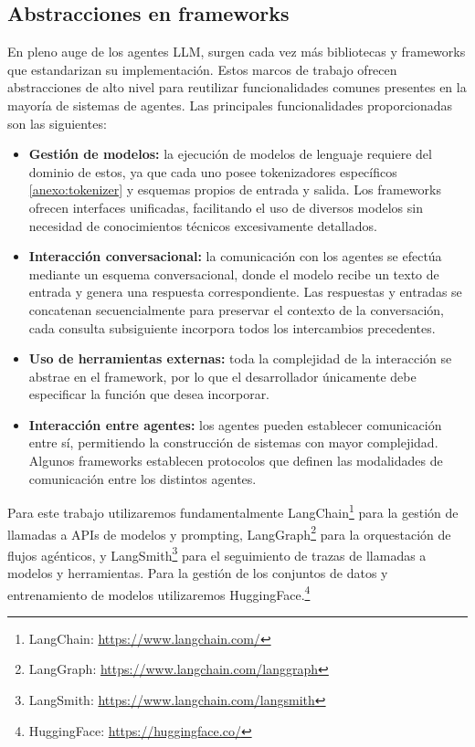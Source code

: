 


\subsection{Abstracciones en frameworks}
\label{sec:abst}
En pleno auge de los agentes LLM, surgen cada vez más bibliotecas y frameworks que estandarizan su implementación. Estos marcos de trabajo ofrecen abstracciones de alto nivel para reutilizar funcionalidades comunes presentes en la mayoría de sistemas de agentes.
Las principales funcionalidades proporcionadas son las siguientes: 
\begin{itemize}
\item {\textbf{Gestión de modelos:}} la ejecución de modelos de lenguaje requiere del dominio de estos, ya que cada uno posee tokenizadores específicos \ref{anexo:tokenizer} y esquemas propios de entrada y salida. Los frameworks ofrecen interfaces unificadas, facilitando el uso de diversos modelos sin necesidad de conocimientos técnicos excesivamente detallados.
\item {\textbf{Interacción conversacional:}} la comunicación con los agentes se efectúa mediante un esquema conversacional, donde el modelo recibe un texto de entrada y genera una respuesta correspondiente. Las respuestas y entradas se concatenan secuencialmente para preservar el contexto de la conversación, cada consulta subsiguiente incorpora todos los intercambios precedentes.
\item {\textbf{Uso de herramientas externas:}} toda la complejidad de la interacción se abstrae en el framework, por lo que el desarrollador únicamente debe especificar la función que desea incorporar.
\item {\textbf{Interacción entre agentes:}} los agentes pueden establecer comunicación entre sí, permitiendo la construcción de sistemas con mayor complejidad. Algunos frameworks establecen protocolos que definen las modalidades de comunicación entre los distintos agentes.
\end{itemize}

Para este trabajo utilizaremos fundamentalmente LangChain\footnote{LangChain: \url{https://www.langchain.com/}} para la gestión de llamadas a APIs de modelos y prompting, LangGraph\footnote{LangGraph: \url{https://www.langchain.com/langgraph}} para la orquestación de flujos agénticos, y LangSmith\footnote{LangSmith: \url{https://www.langchain.com/langsmith}} para el seguimiento de trazas de llamadas a modelos y herramientas. Para la gestión de los conjuntos de datos y entrenamiento de modelos utilizaremos HuggingFace.\footnote{HuggingFace: \url{https://huggingface.co/}} 


